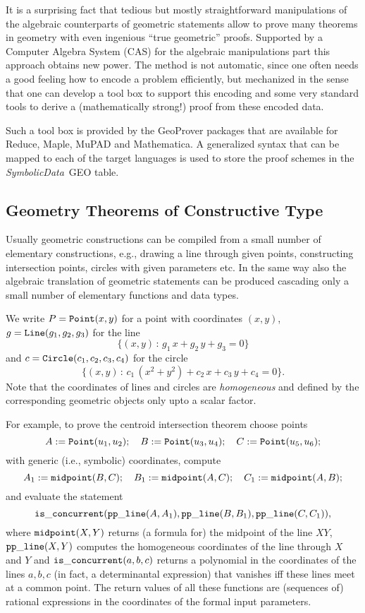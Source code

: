 \documentclass[11pt]{article}
\newcommand{\SD}{{\it Symbo\-lic\-Data}}
\newcommand{\gf}[1]{{\tt #1}\/}
\begin{document}
It is a surprising fact that tedious but mostly straightforward
manipulations of the algebraic counterparts of geometric statements
allow to prove many theorems in geometry with even ingenious ``true
geometric'' proofs. Supported by a Computer Algebra System (CAS) for
the algebraic manipulations part this approach obtains new power.  The
method is not automatic, since one often needs a good feeling how to
encode a problem efficiently, but mechanized in the sense that one can
develop a tool box to support this encoding and some very standard
tools to derive a (mathematically strong!) proof from these encoded
data.

Such a tool box is provided by the GeoProver packages \cite{GeoProver}
that are available for Reduce, Maple, MuPAD and Mathematica.  A
generalized syntax that can be mapped to each of the target languages
is used to store the proof schemes in the \SD\ GEO table.

\subsection{Geometry Theorems of Constructive Type}

Usually geometric constructions can be compiled from a small number of
elementary constructions, e.g., drawing a line through given points,
constructing intersection points, circles with given parameters etc.
In the same way also the algebraic translation of geometric statements
can be produced cascading only a small number of elementary functions
and data types.

We write $P=\gf{Point}(x,y)$ for a point with coordinates $(x,y)$,
$g=\gf{Line}(g_1,g_2,g_3)$ for the line $$\{(x,y)\,:\,
g_1\,x+g_2\,y+g_3=0 \}$$ and $c=\gf{Circle}(c_1,c_2,c_3,c_4)$ for the
circle $$\{(x,y) \,:\, c_1\,(x^2+y^2)+c_2\,x+c_3\,y+c_4=0 \}.$$ Note
that the coordinates of lines and circles are {\em homogeneous} and
defined by the corresponding geometric objects only upto a scalar
factor.
\medskip

For example, to prove the centroid intersection theorem choose
points 
\[A:=\gf{Point}(u_1,u_2);\quad B:=\gf{Point}(u_3,u_4);\quad
C:=\gf{Point}(u_5,u_6); 
\] 
with generic (i.e., symbolic) coordinates, compute
\[A_1:=\gf{midpoint}(B,C);\quad B_1:=\gf{midpoint}(A,C);\quad
C_1:=\gf{midpoint}(A,B); 
\]
and evaluate the statement 
\begin{equation}\label{centroid}
\gf{is\_concurrent}(\gf{pp\_line}(A,A_1), \gf{pp\_line}(B,B_1),
\gf{pp\_line}(C,C_1)),
\end{equation}
where $\gf{midpoint}(X,Y)$ returns (a formula for) the midpoint of the
line $XY$, $\gf{pp\_line}(X,Y)$ computes the homogeneous coordinates
of the line through $X$ and $Y$ and $\gf{is\_concurrent}(a,b,c)$
returns a polynomial in the coordinates of the lines $a,b,c$ (in fact,
a determinantal expression) that vanishes iff these lines meet at a
common point.  The return values of all these functions are (sequences
of) rational expressions in the coordinates of the formal input
parameters.
\end{document}
